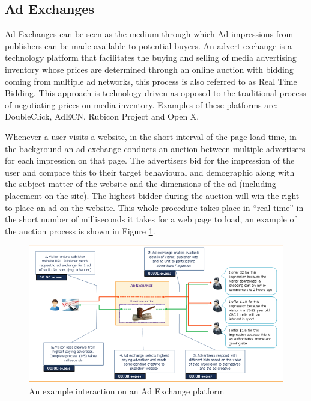 \documentclass{article}
\begin{document}
\subsection{Ad Exchanges} \label{AdExchanges}
Ad Exchanges can be seen as the medium through which Ad impressions from publishers can be made available to potential buyers. An advert exchange is a technology platform that facilitates the buying and selling of media advertising inventory whose prices are determined through an online auction with bidding coming from multiple ad networks, this process is also referred to as Real Time Bidding. This approach is technology-driven as opposed to the traditional process of negotiating prices on media inventory. Examples of these platforms are: DoubleClick, AdECN, Rubicon Project and Open X. \newline

Whenever a user visits a website, in the short interval of the page load time, in the background an ad exchange conducts an auction between multiple advertisers for each impression on that page. The advertisers bid for the impression of the user and compare this to their target behavioural and demographic along with the subject matter of the website and the dimensions of the ad (including placement on the site). The highest bidder during the auction will win the right to place an ad on the website. This whole procedure takes place in ``real-time'' in the short number of milliseconds it takes for a web page to load, an example of the auction process is shown in Figure \ref{fig:adExchange}. 

\begin{figure}[H]
    \centering
    \includegraphics[width=1\textwidth]{adExchange}
    \caption{An example interaction on an Ad Exchange platform \parencite{adExchanges}}
    \label{fig:adExchange}
\end{figure}
\end{document}
